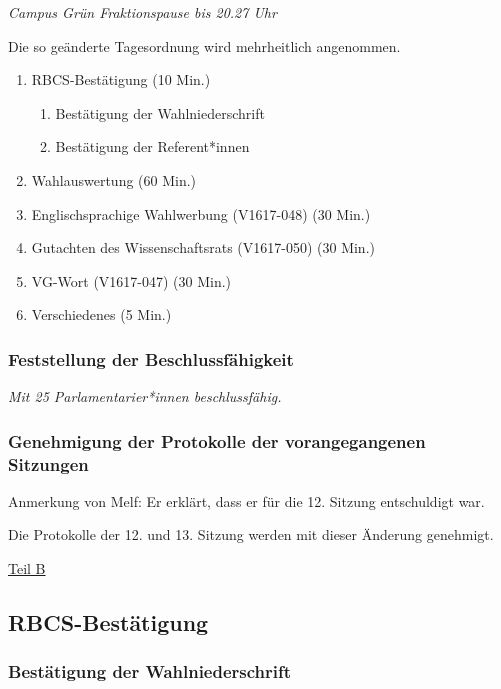 \documentclass[ngerman,headheight=70pt]{scrartcl}
\begin{document}
    \textit{Campus Grün Fraktionspause bis 20.27 Uhr}

    Die so geänderte Tagesordnung wird mehrheitlich angenommen.

    \begin{enumerate}[label={\textbf{Top \theenumi}},leftmargin=*]
        \item RBCS-Bestätigung (10 Min.)
        \begin{enumerate}
            \item Bestätigung der Wahlniederschrift
            \item Bestätigung der Referent*innen
        \end{enumerate}
        \item Wahlauswertung (60 Min.)
        \item Englischsprachige Wahlwerbung (V1617-048) (30 Min.)
        \item Gutachten des Wissenschaftsrats (V1617-050) (30 Min.)
        \item VG-Wort (V1617-047) (30 Min.)
        \item Verschiedenes (5 Min.)
    \end{enumerate}

    \subsubsection{Feststellung der Beschlussfähigkeit}

    \textit{Mit 25 Parlamentarier*innen beschlussfähig.}

    \subsubsection{Genehmigung der Protokolle der vorangegangenen Sitzungen}

    Anmerkung von Melf: Er erklärt, dass er für die 12. Sitzung entschuldigt war.

    Die Protokolle der 12. und 13. Sitzung werden mit dieser Änderung genehmigt.


    \vspace{0.5cm}
    {\Large \underline{Teil B}}


    \subsection{RBCS-Bestätigung}

    \subsubsection{Bestätigung der Wahlniederschrift}
\end{document}
